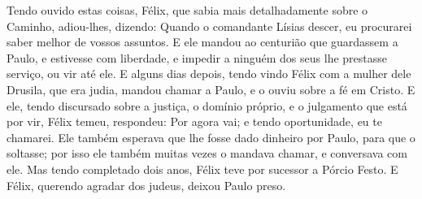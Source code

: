 {Tendo ouvido estas coisas, Félix, que sabia mais detalhadamente sobre o Caminho, adiou-lhes, dizendo: Quando o comandante Lísias descer, eu procurarei saber melhor de vossos assuntos.
E ele mandou ao centurião que guardassem a Paulo, e estivesse com
{} liberdade, e impedir a ninguém dos seus
{} lhe prestasse serviço, ou vir até ele.
E alguns dias depois, tendo vindo Félix com a mulher dele Drusila, que era judia, mandou chamar a Paulo, e o ouviu sobre a fé em Cristo.
E ele, tendo discursado sobre a justiça, o domínio próprio, e o julgamento que está por vir, Félix temeu,
{} respondeu: Por agora vai; e tendo
{} oportunidade, eu te chamarei.
Ele também esperava que lhe fosse dado
{} dinheiro por Paulo, para que o soltasse; por isso ele também muitas vezes o mandava chamar, e conversava com ele.
Mas tendo completado dois anos, Félix teve por sucessor a Pórcio Festo. E Félix, querendo agradar dos judeus, deixou Paulo preso.

}
